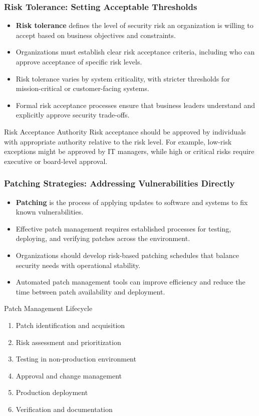 \documentclass{beamer}
\begin{document}
\begin{frame}
\frametitle{Risk Tolerance: Setting Acceptable Thresholds}
\begin{itemize}
    \item \textbf{Risk tolerance} defines the level of security risk an organization is willing to accept based on business objectives and constraints.
    \item Organizations must establish clear risk acceptance criteria, including who can approve acceptance of specific risk levels.
    \item Risk tolerance varies by system criticality, with stricter thresholds for mission-critical or customer-facing systems.
    \item Formal risk acceptance processes ensure that business leaders understand and explicitly approve security trade-offs.
\end{itemize}

\begin{alertblock}{Risk Acceptance Authority}
    \scriptsize
Risk acceptance should be approved by individuals with appropriate authority relative to the risk level. For example, low-risk exceptions might be approved by IT managers, while high or critical risks require executive or board-level approval.
\end{alertblock}
\end{frame}

\begin{frame}
\frametitle{Patching Strategies: Addressing Vulnerabilities Directly}
\begin{itemize}
    \item \textbf{Patching} is the process of applying updates to software and systems to fix known vulnerabilities.
    \item Effective patch management requires established processes for testing, deploying, and verifying patches across the environment.
    \item Organizations should develop risk-based patching schedules that balance security needs with operational stability.
    \item Automated patch management tools can improve efficiency and reduce the time between patch availability and deployment.
\end{itemize}

\begin{block}{Patch Management Lifecycle}
\scriptsize
\begin{enumerate}
    \item Patch identification and acquisition
    \item Risk assessment and prioritization
    \item Testing in non-production environment
    \item Approval and change management
    \item Production deployment
    \item Verification and documentation
\end{enumerate}
\end{block}
\end{frame}
\end{document}
